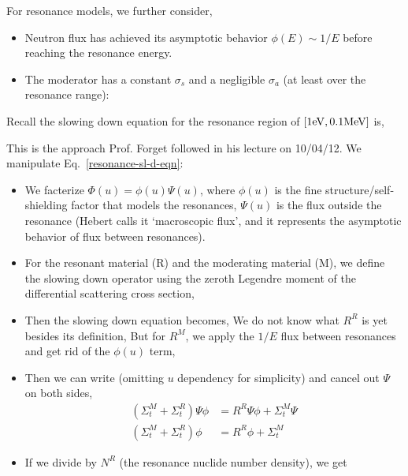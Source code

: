 \documentclass{school-22.211-notes}
\begin{document}
For resonance models, we further consider, 
\begin{itemize}
\item Neutron flux has achieved its asymptotic behavior $\phi(E) \sim 1/E$ before reaching the resonance energy. 
\item The moderator has a constant $\sigma_s$ and a negligible $\sigma_a$ (at least over the resonance range): 
\end{itemize}

Recall the slowing down equation for the resonance region of $[1\mathrm{eV}, 0.1 \mathrm{MeV}]$ is, 





This is the approach Prof. Forget followed in his lecture on 10/04/12. We manipulate Eq.~\ref{resonance-sl-d-eqn}:
\begin{itemize}
\item We facterize $\Phi(u) = \phi(u) \Psi(u)$, where $\phi(u)$ is the fine structure/self-shielding factor that models the resonances, $\Psi(u)$ is the flux outside the resonance (Hebert calls it `macroscopic flux', and it represents the asymptotic behavior of flux between resonances). 

\item For the resonant material (R) and the moderating material (M), we define the slowing down operator using the zeroth Legendre moment of the differential scattering cross section, 

\item Then the slowing down equation becomes, 
  We do not know what $R^R$ is yet besides its definition,
  But for $R^M$, we apply the $1/E$ flux between resonances and get rid of the $\phi(u)$ term, 

\item Then we can write (omitting $u$ dependency for simplicity) and cancel out $\Psi$ on both sides, 
  \begin{align}
    (\Sigma_{t}^M + \Sigma_t^R) \Psi \phi &= R^R \Psi \phi +  \Sigma_{t}^M \Psi  \\
   (\Sigma_t^M  + \Sigma_{t}^R ) \phi &=  R^R \phi + \Sigma_t^M  
  \end{align}

\item If we divide by $N^R$ (the resonance nuclide number density), we get 
\end{itemize}
\end{document}
